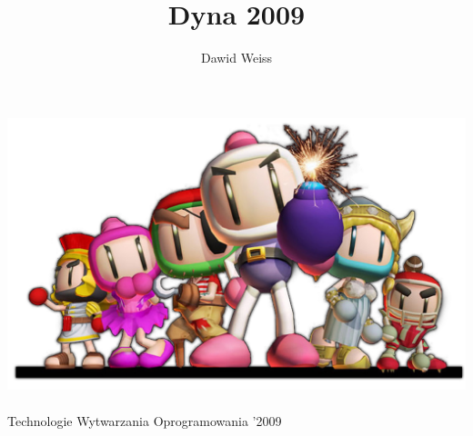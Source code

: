 \documentclass[compress]{beamer}
\title{Dyna 2009}
\author{Dawid Weiss}
\institute{Institute of Computing Science\\Poznan University of Technology}
\date{}
\begin{document}
\begin{frame}
    \begin{center}
    \includegraphics[width=.9\linewidth]{figures/dyna}\\[2mm]
    \\
    Technologie Wytwarzania Oprogramowania '2009
    \end{center}
    \pplogo
\end{frame}

\begin{frame}[plain]
    \begin{center}
    \end{center}
\end{frame}

\begin{frame}[plain]
\end{frame}

\begin{frame}[plain]    
\end{frame}

\begin{frame}[plain]
    \begin{abscenter}
    \end{abscenter}
\end{frame}
\end{document}
